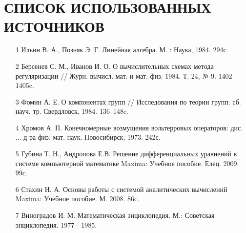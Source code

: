 \documentclass[article, bachelor, och, pract]{SCWorks}
\begin{document}
\section*{СПИСОК ИСПОЛЬЗОВАННЫХ ИСТОЧНИКОВ}
\begin{itemize}
\item[1] Ильин В. А., Позняк Э. Г. Линейная алгебра. М. : Наука, 1984. 294с.
\item[2] Берсенев С. М., Иванов И. О. О вычислительных схемах метода регуляризации  // Журн. вычисл. мат. и мат. физ. 1984. Т. 24, № 9. 1402–1405c. 
\item[3] Фомин А. Е. О компонентах групп // Исследования по теории групп: сб. науч. тр. Свердловск, 1984. 136–148c.
\item[4] Хромов А. П. Конечномерные возмущения вольтерровых операторов: дис. ... д-ра физ.-мат. наук. Новосибирск, 1973. 242с.
\item[5] Губина Т. Н., Андропова Е.В. Решение дифференциальных уравнений в системе компьютерной математике Maxima: Учебное пособие. Елец. 2009. 99с.
\item[6] Стахин Н. А. Основы работы с системой аналитических вычислений Maxima: Учебное пособие. М. 2008. 86с.
\item[7] Виноградов И. М. Математическая энциклопедия. М.: Советская энциклопедия. 1977—1985.
\end{itemize}
\end{document}
